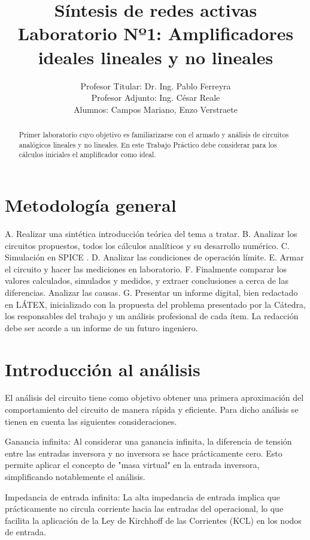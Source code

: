 \documentclass[12pt]{article}
\title{Síntesis de redes activas \\ Laboratorio Nº1: Amplificadores ideales lineales y no lineales}
\author{Profesor Titular: Dr. Ing. Pablo Ferreyra \\  Profesor Adjunto: Ing. César Reale \\ Alumnos: Campos Mariano, 
		Enzo Verstraete}
\begin{document}
	\maketitle
	
	\begin{abstract}
		Primer laboratorio cuyo objetivo es familiarizarse con el armado y análisis de circuitos analógicos
		lineales y no lineales. En este Trabajo Práctico debe considerar para los cálculos iniciales el
		amplificador como ideal. \newpage
	\end{abstract}
	
	
	\section{Metodología general}	
		A. Realizar una sintética introducción teórica del tema a tratar.
		B. Analizar los circuitos propuestos, todos los cálculos analíticos y su desarrollo numérico.
		C. Simulación en SPICE .
		D. Analizar las condiciones de operación límite.
		E. Armar el circuito y hacer las mediciones en laboratorio.
		F. Finalmente comparar los valores calculados, simulados y medidos, y extraer conclusiones a
		cerca de las diferencias. Analizar las causas.
		G. Presentar un informe digital, bien redactado en LÁTEX, inicializado con la propuesta del
		problema presentado por la Cátedra, los responsables del trabajo y un análisis profesional de
		cada ítem. La redacción debe ser acorde a un informe de un futuro ingeniero.
	
	\section{Introducción al análisis}
	
	El análisis del	circuito tiene como objetivo obtener una primera aproximación del comportamiento
	del circuito de manera rápida y eficiente. Para dicho análisis se tienen en cuenta las siguientes
	consideraciones.
	
	Ganancia infinita: Al considerar una ganancia infinita, la diferencia de tensión entre las entradas inversora y no inversora se hace prácticamente cero. Esto permite aplicar el concepto de "masa virtual" en la entrada inversora, simplificando notablemente el análisis.
	
	Impedancia de entrada infinita: La alta impedancia de entrada implica que prácticamente no circula corriente hacia las entradas del operacional, lo que facilita la aplicación de la Ley de Kirchhoff de las Corrientes (KCL) en los nodos de entrada.
	
\end{document}
